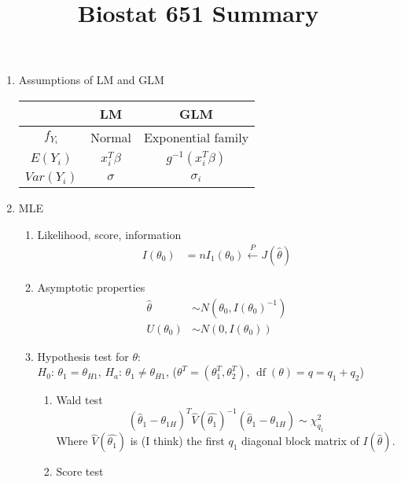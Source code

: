 \documentclass{amsart}
\title{Biostat 651 Summary}
\begin{document}
\maketitle

\begin{enumerate}
\item Assumptions of LM and GLM
  \begin{center}
    \begin{tabular}{|c|c|c|}
      \hline
      & LM & GLM \\
      \hline
      $f_{Y_i}$ & Normal & Exponential family \\
      \hline
      $E(Y_i)$ & $x_i^T \beta$ & $g^{-1}(x_i^T \beta)$ \\
      \hline
      $Var(Y_i)$ & $\sigma$ & $\sigma_i$ \\
      \hline
    \end{tabular}
  \end{center}
\item MLE
  \begin{enumerate}
  \item Likelihood, score, information
    \begin{align*}
      I(\theta_0) & = n I_1(\theta_0) \overset{P}{\longleftarrow} J(\hat{\theta}) 
    \end{align*}
  \item Asymptotic properties
    \begin{align*}
      \hat{\theta} & \sim N(\theta_0 , I(\theta_0)^{-1}) \\
      U(\theta_0) & \sim N(0, I(\theta_0)) 
    \end{align*}
  \item Hypothesis test for $\theta$: \\
    $H_0$: $\theta_1 = \theta_{H1}$, $H_a$:
    $\theta_1 \neq \theta_{H1}$,
    ($\theta^T = (\theta_1^T, \theta_2^T)$,
    $\operatorname{df}(\theta) = q = q_1 + q_2$)
    \begin{enumerate}
    \item Wald test
      \begin{equation*}
        (\hat{\theta}_1 - \theta_{1H})^T \hat{V}(\hat{\theta_1})^{-1}
        (\hat{\theta}_1 - \theta_{1H}) \sim \chi^2_{q_1}
      \end{equation*}
      Where $\hat{V}(\hat{\theta_1})$ is (I think) the first $q_1$
      diagonal block matrix of $I(\hat{\theta})$.
    \item Score test
      \begin{equation*}

\end{equation*}
\end{enumerate}
\end{enumerate}
\end{enumerate}
\end{document}
